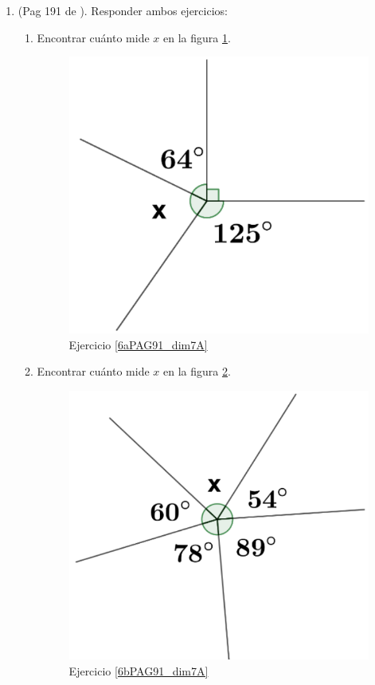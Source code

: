 \begin{enumerate}
	\item (Pag 191 de \cite{Dimensions_Math_7A}). Responder ambos ejercicios:
	\begin{enumerate}[label=\Alph*) ]
		\item \label{6aPAG91_dim7A}Encontrar cuánto mide $x$ en la figura \ref{dimensions_7A_p191_6a}.
		\begin{figure}[H]
			\centering
			\includegraphics[width=0.3\linewidth]{Geometria/imgs/dimensions_7A_p191_6a}
			\caption{Ejercicio \ref{6aPAG91_dim7A}}
			\label{dimensions_7A_p191_6a}
		\end{figure}
		\item \label{6bPAG91_dim7A}Encontrar cuánto mide $x$ en la figura \ref{dimensions_7A_p191_6b}.
		\begin{figure}[H]
			\centering
			\includegraphics[width=0.3\linewidth]{Geometria/imgs/dimensions_7A_p191_6b}
			\caption{Ejercicio \ref{6bPAG91_dim7A}}
			\label{dimensions_7A_p191_6b}
		\end{figure}
	\end{enumerate}	
	

\end{enumerate}

